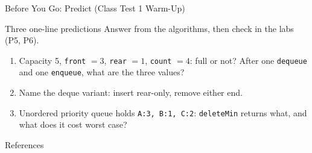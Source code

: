 \documentclass[aspectratio=169]{beamer}
\begin{document}
\begin{frame}{Before You Go: Predict (Class Test 1 Warm-Up)}
  \begin{block}{Three one-line predictions}
    Answer from the algorithms, then check in the labs (P5, P6).
  \end{block}
  \begin{enumerate}
    \item Capacity 5, \texttt{front} $= 3$, \texttt{rear} $= 1$,
      \texttt{count} $= 4$: full or not? After one \texttt{dequeue} and one
      \texttt{enqueue}, what are the three values?
    \item Name the deque variant: insert rear-only, remove either end.
    \item Unordered priority queue holds \texttt{A:3, B:1, C:2}:
      \texttt{deleteMin} returns what, and what does it cost worst case?
  \end{enumerate}
\end{frame}

\begin{frame}[allowframebreaks]{References}
  \footnotesize
  
  
\end{frame}
\end{document}

